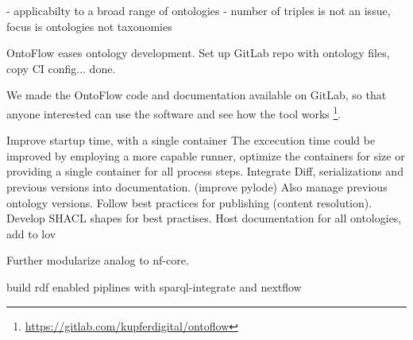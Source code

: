 \documentclass[sigconf]{acmart}
\begin{document}
- applicabilty to a broad range of ontologies 
- number of triples is not an issue, focus is ontologies not taxonomies

OntoFlow eases ontology development.
Set up GitLab repo with ontology files, copy CI config... done.

We made the OntoFlow code and documentation available on GitLab, so that anyone interested can use the software and see how the tool works \footnote{\url{https://gitlab.com/kupferdigital/ontoflow}}. 


Improve startup time, with a single container
 The excecution time could be improved by employing a more capable runner, optimize the containers for size or providing a single container for all process steps.
Integrate Diff, serializations and previous versions into documentation. (improve pylode)
Also manage previous ontology versions.
Follow best practices for publishing (content resolution).
Develop SHACL shapes for best practises.
Host documentation for all ontologies, add to lov

Further modularize analog to nf-core.

build rdf enabled piplines with sparql-integrate and nextflow



\end{document}
